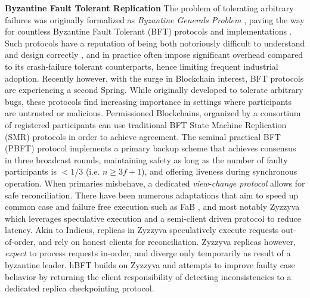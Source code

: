 \textbf{Byzantine Fault Tolerant Replication} 
 The problem of tolerating arbitrary failures was originally formalized as \textit{Byzantine Generals Problem} \cite{lamport2019byzantine}, paving the way for countless Byzantine Fault Tolerant (BFT) protocols and implementations \cite{castro1999practical, martin2006fast, kotla2007zyzzyva, pires2018generalized, bessani2014state, lamport2011byzantizing, arun2019ezbft, malkhi2019flexible, duan2014hbft, yin2003separating}. Such protocols have a reputation of being  both notoriously difficult to understand and design correctly \cite{abraham2017revisiting, abraham2018revisiting, shrestha2019revisiting}, and in practice often impose significant overhead compared to its crash-failure tolerant counterparts, hence limiting frequent industrial adoption.
Recently however, with the surge in Blockchain interest, BFT protocols are experiencing a second Spring. While originally developed to tolerate arbitrary bugs, these protocols find increasing importance in settings where participants are untrusted or malicious. Permissioned Blockchains, organized by a consortium of registered participants can use traditional BFT State Machine Replication (SMR) protocols in order to achieve agreement. 
The seminal practical BFT (PBFT) protocol \cite{castro1999practical} implements a primary backup scheme that achieves consensus in three broadcast rounds, maintaining safety as long as the number of faulty participants is $<1/3$ (i.e. $n\geq 3f+1$), and offering liveness during synchronous operation. When primaries misbehave, a dedicated \textit{view-change protocol} allows for safe reconciliation. There have been numerous adaptations that aim to speed up common case and failure free execution such as FaB \cite{martin2006fast}, and most notably Zyzzyva \cite{kotla2007zyzzyva} which leverages speculative execution and a semi-client driven protocol to reduce latency. Akin to Indicus, replicas in Zyzzyva speculatively execute requests out-of-order, and rely on honest clients for reconciliation. Zyzzyva replicas however, \textit{expect} to process requests in-order, and diverge only temporarily as result of a byzantine leader. hBFT \cite{duan2014hbft} builds on Zyzzyva and attempts to improve faulty case behavior by returning the client responsibility of detecting inconsistencies to a dedicated replica checkpointing protocol. 

